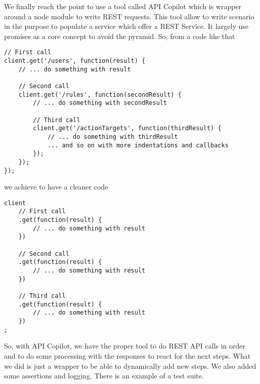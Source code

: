 We finally reach the point to use a tool called API Copilot which is wrapper around a node module to write REST requests. This tool allow to write scenario in the purpose to populate a service which offer a REST Service. It largely use promises as a core concept to avoid the pyramid. So, from a code like that

\begin{lstlisting}
// First call
client.get('/users', function(result) {
	// ... do something with result

	// Second call
	client.get('/rules', function(secondResult) {
		// ... do something with secondResult

		// Third call
		client.get('/actionTargets', function(thirdResult) {
			// ... do something with thirdResult
			... and so on with more indentations and callbacks
		});
	});
});
\end{lstlisting}

we achieve to have a cleaner code

\begin{lstlisting}
client
	// First call
	.get(function(result) {
		// ... do something with result
	})
	
	// Second call
	.get(function(result) {
		// ... do something with result
	})
	
	// Third call
	.get(function(result) {
		// ... do something with result
	})
;	
\end{lstlisting}

So, with API Copilot, we have the proper tool to do REST API calls in order and to do some processing with the responses to react for the next steps. What we did is just a wrapper to be able to dynamically add new steps. We also added some assertions and logging. There is an example of a test suite.

